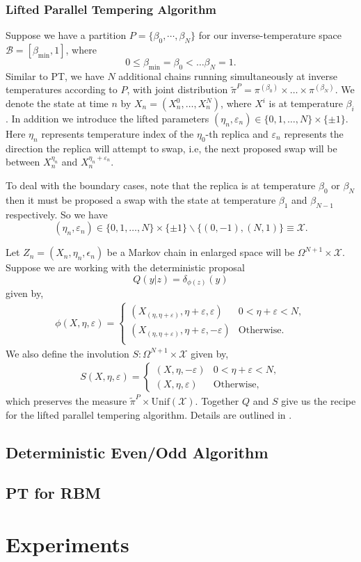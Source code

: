 \documentclass[12pt]{article}
\newcommand{\eps}{\varepsilon}
\begin{document}
\subsubsection{Lifted Parallel Tempering Algorithm}
Suppose we have a partition $P=\{\beta_0,\cdots,\beta_N\}$ for our inverse-temperature space $\mathcal{B}=[\beta_{\min},1]$, where 
\[0\leq \beta_{\min}= \beta_0<\dots\beta_N=1.\]
Similar to PT, we have $N$ additional chains running simultaneously at inverse temperatures according to $P$, with joint distribution $\tilde{\pi}^P=\pi^{(\beta_0)}\times\dots\times\pi^{(\beta_N)}$. We denote the state at time $n$ by $X_n=(X^0_n,\dots, X^N_n)$, where $X^i$ is at temperature $\beta_i$. In addition we introduce the lifted parameters $(\eta_n,\varepsilon_n)\in \{0,1,\dots,N\}\times\{\pm 1\}$. Here $\eta_n$ represents temperature index of the $\eta_0$-th replica and $\varepsilon_n$ represents the direction the replica will attempt to swap, i.e, the next proposed swap will be between $X^{\eta_n}_n$ and $X^{\eta_n+\eps_n}_n$. 

To deal with the boundary cases, note that the replica is at temperature $\beta_0$ or $\beta_N$ then it must be proposed a swap with the state at temperature $\beta_1$ and $\beta_{N-1}$ respectively. So we have
\[(\eta_n,\varepsilon_n)\in \{0,1,\dots,N\}\times\{\pm 1\}\backslash\{(0,-1),(N,1)\}\equiv \mathcal{X}. \]

Let $Z_n=(X_n,\eta_n,\epsilon_n)$ be a Markov chain in enlarged space will be $\Omega^{N+1}\times\mathcal{X}$. Suppose we are working with the deterministic proposal
\[Q(y|z)=\delta_{\phi(z)}(y)\]
given by, 
\begin{align*}
\phi(X,\eta,\eps)=
\begin{cases}
(X_{(\eta,\eta+\eps)},\eta+\eps,\eps) &   0<\eta+\eps<N,\\
(X_{(\eta,\eta+\eps)},\eta+\eps,-\eps) &  \mathrm{Otherwise}.\\
\end{cases}
\end{align*}
We also define the involution $S:\Omega^{N+1}\times\mathcal{X}$ given by,
\begin{align*}
S(X,\eta,\eps)=
\begin{cases}
(X,\eta,-\eps) &   0<\eta+\eps<N,\\
(X,\eta,\eps) &  \mathrm{Otherwise},
\end{cases}
\end{align*}
which preserves the measure $\tilde{\pi}^P\times\mathrm{Unif}(\mathcal{X})$. Together $Q$ and $S$ give us the recipe for the lifted parallel tempering algorithm. Details are outlined in \cite{wu_irreversible_2017}.

\subsection{Deterministic Even/Odd Algorithm}
\subsection{PT for RBM}
\section{Experiments}

 

\end{document}
